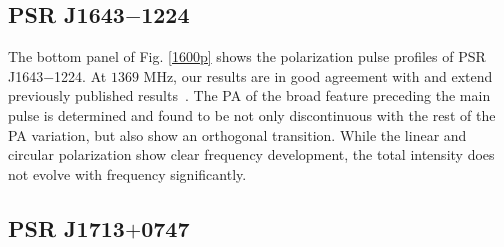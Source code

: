 \documentclass[useAMS,usenatbib]{mn2e}
\begin{document}
%
%
%


\subsection{PSR J1643$-$1224}

The bottom panel of Fig. \ref{1600p} shows the polarization pulse profiles of 
PSR J1643$-$1224.
%
At $1369$ MHz, our results are in good agreement with and extend previously published
results~\citep{Ord04,Yan11}.
%
The PA of the broad feature preceding the main pulse is determined and 
found to be not only discontinuous with the rest of the PA variation, but 
also show an orthogonal transition.
%
While the linear and circular polarization show clear frequency development,
the total intensity does not evolve with frequency significantly.


\subsection{PSR J1713$+$0747}
\end{document}
